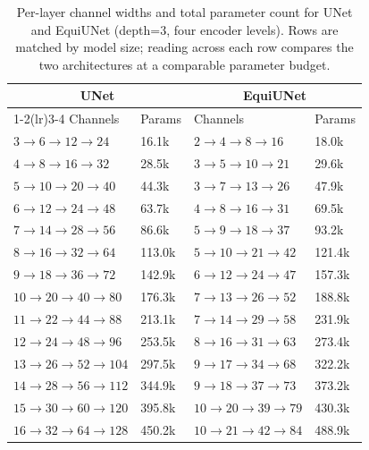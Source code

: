 \begin{table}[ht]
\centering
\caption{Per-layer channel widths and total parameter count for UNet and EquiUNet (depth=3, four encoder levels). Rows are matched by model size; reading across each row compares the two architectures at a comparable parameter budget.}
\label{tab:arch_comparison}
\begin{tabular}{ll ll}
\toprule
\multicolumn{2}{c}{\textbf{UNet}} & \multicolumn{2}{c}{\textbf{EquiUNet}} \\
\cmidrule(lr){1-2}\cmidrule(lr){3-4}
Channels & Params & Channels & Params \\
\midrule
$3{\to}6{\to}12{\to}24$ & 16.1k & $2{\to}4{\to}8{\to}16$ & 18.0k \\
$4{\to}8{\to}16{\to}32$ & 28.5k & $3{\to}5{\to}10{\to}21$ & 29.6k \\
$5{\to}10{\to}20{\to}40$ & 44.3k & $3{\to}7{\to}13{\to}26$ & 47.9k \\
$6{\to}12{\to}24{\to}48$ & 63.7k & $4{\to}8{\to}16{\to}31$ & 69.5k \\
$7{\to}14{\to}28{\to}56$ & 86.6k & $5{\to}9{\to}18{\to}37$ & 93.2k \\
$8{\to}16{\to}32{\to}64$ & 113.0k & $5{\to}10{\to}21{\to}42$ & 121.4k \\
$9{\to}18{\to}36{\to}72$ & 142.9k & $6{\to}12{\to}24{\to}47$ & 157.3k \\
$10{\to}20{\to}40{\to}80$ & 176.3k & $7{\to}13{\to}26{\to}52$ & 188.8k \\
$11{\to}22{\to}44{\to}88$ & 213.1k & $7{\to}14{\to}29{\to}58$ & 231.9k \\
$12{\to}24{\to}48{\to}96$ & 253.5k & $8{\to}16{\to}31{\to}63$ & 273.4k \\
$13{\to}26{\to}52{\to}104$ & 297.5k & $9{\to}17{\to}34{\to}68$ & 322.2k \\
$14{\to}28{\to}56{\to}112$ & 344.9k & $9{\to}18{\to}37{\to}73$ & 373.2k \\
$15{\to}30{\to}60{\to}120$ & 395.8k & $10{\to}20{\to}39{\to}79$ & 430.3k \\
$16{\to}32{\to}64{\to}128$ & 450.2k & $10{\to}21{\to}42{\to}84$ & 488.9k \\
\bottomrule
\end{tabular}
\end{table}